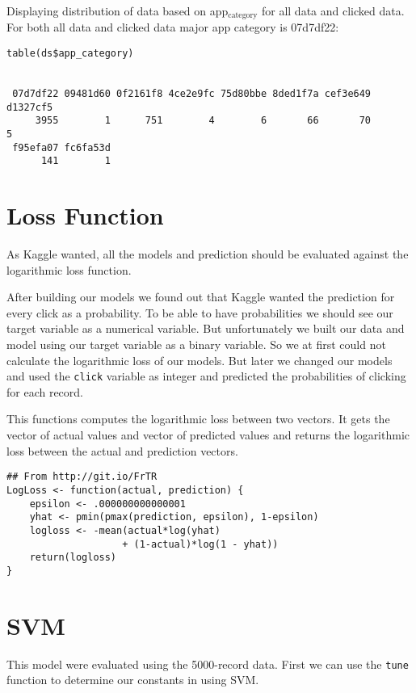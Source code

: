 \documentclass[11pt,a4paper]{article}
\begin{document}
Displaying distribution of data based on app$_{\text{category}}$ for all data and clicked data. For both all data and clicked data major app category is 07d7df22:

\begin{verbatim}
table(ds$app_category)


 07d7df22 09481d60 0f2161f8 4ce2e9fc 75d80bbe 8ded1f7a cef3e649 d1327cf5 
     3955        1      751        4        6       66       70        5 
 f95efa07 fc6fa53d 
      141        1
\end{verbatim}

\section{Loss Function}
\label{sec-4}
As Kaggle wanted, all the models and prediction should be evaluated against
the logarithmic loss function. 

After building our models we found out
that Kaggle wanted the prediction for every click as a probability. To be able to
have probabilities we should see our target variable as a numerical variable. But unfortunately
we built our data and model using our target variable as a binary variable. 
So we at first could not
calculate the logarithmic loss of our models. But
later we changed our models and used the \texttt{click} variable
as integer and predicted the probabilities of clicking
for each record.

This functions computes the logarithmic loss between two vectors.
It gets the vector of actual values and vector of
predicted values and returns the 
logarithmic loss between the actual and prediction vectors.

\begin{verbatim}
## From http://git.io/FrTR
LogLoss <- function(actual, prediction) {
    epsilon <- .000000000000001
    yhat <- pmin(pmax(prediction, epsilon), 1-epsilon)
    logloss <- -mean(actual*log(yhat)
                    + (1-actual)*log(1 - yhat))
    return(logloss)
}
\end{verbatim}

\section{SVM}
\label{sec-5}
This model were evaluated using the 5000-record data.
First we can use the \texttt{tune} function to determine our constants in using SVM.
\end{document}
